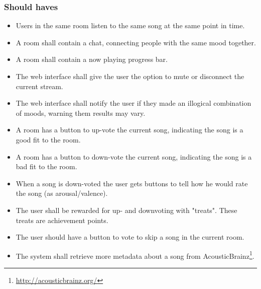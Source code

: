 \subsubsection{Should haves}
\begin{itemize}
\item Users in the same room listen to the same song at the same point in time.

\item A room shall contain a chat, connecting people with the same mood together.

\item A room shall contain a now playing progress bar.

\item The web interface shall give the user the option to mute or disconnect the current stream.

\item The web interface shall notify the user if they made an illogical combination of moods, warning them results may vary.

\item A room has a button to up-vote the current song, indicating the song is a good fit to the room.

\item A room has a button to down-vote the current song, indicating the song is a bad fit to the room.

\item When a song is down-voted the user gets buttons to tell how he would rate the song (as arousal/valence).

\item The user shall be rewarded for up- and downvoting with "treats". These treats are achievement points.

\item The user should have a button to vote to skip a song in the current room.

\item The system shall retrieve more metadata about a song from \gls{AcousticBrainz}\footnote{\url{http://acousticbrainz.org/}}.

\end{itemize}

